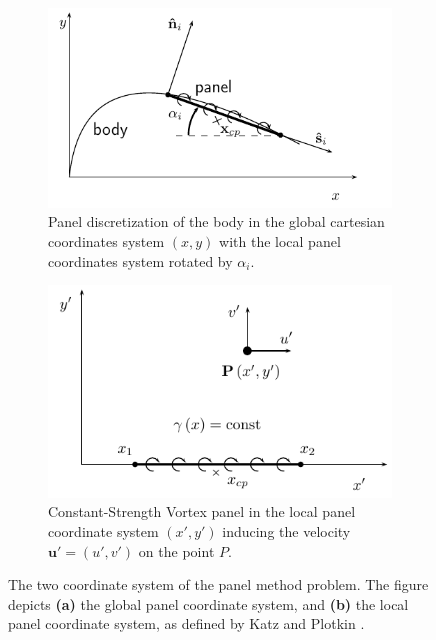 	\begin{figure}[!h]
        \centering
        \begin{subfigure}[b]{0.45\textwidth}
                \includegraphics[width=\textwidth]{figures/lagrangian/panelCoordinateDefinition.pdf}
                \caption{Panel discretization of the body in the global cartesian coordinates system $\left(x,y\right)$ with the local panel coordinates system rotated by $\alpha_i$.}
                \label{fig:panelCoordinateDefinition}
        \end{subfigure}%
        \qquad %
        \begin{subfigure}[b]{0.45\textwidth}
                \includegraphics[width=\textwidth]{figures/lagrangian/vortexPanelDefinition.pdf}
                \caption{Constant-Strength Vortex panel in the local panel coordinate system $\left(x',y'\right)$ inducing the velocity $\mathbf{u}'=(u',v')$ on the point $P$.}
                \label{fig:vortexPanelDefinition}
        \end{subfigure}
        \caption{The two coordinate system of the panel method problem. The figure depicts \textbf{(a)} the global panel coordinate system, and \textbf{(b)} the local panel coordinate system, as defined by Katz and Plotkin \cite{Katz2001a}.}
        \label{fig:panelDefinitions}
	\end{figure}	
	
